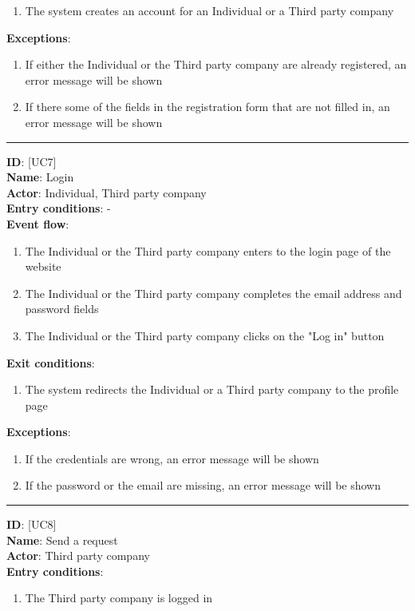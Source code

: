 \documentclass[12pt]{report}
\newcommand\usecase[1]{ [UC#1] }
\begin{document}
\begin{itemize}
\begin{enumerate}
    			\item{The system creates an account for an Individual or a Third party company}
  		\end{enumerate}
  	\textbf{Exceptions}: 
  		\begin{enumerate}
    			\item{If either the Individual or the Third party company are already registered, an error message will be shown}
    			\item{If there some of the fields in the registration form that are not filled in, an error message will be shown}
  		\end{enumerate}
  	\rule{\linewidth}{0.4pt}
  	\textbf{ID}: \usecase{7} \\
  	\textbf{Name}: Login \\
    \textbf{Actor}: Individual, Third party company \\
    \textbf{Entry conditions}: - \\
  	\textbf{Event flow}:
  		\begin{enumerate}
    			\item{The Individual or the Third party company enters to the login page of the website}
    			\item{The Individual or the Third party company completes the email address and password fields}
    			\item{The Individual or the Third party company clicks on the "Log in" button}
  		\end{enumerate}
  	\textbf{Exit conditions}:
  		\begin{enumerate}
    			\item{The system redirects the Individual or a Third party company to the profile page}
  		\end{enumerate}
  	\textbf{Exceptions}: 
  		\begin{enumerate}
    			\item{If the credentials are wrong, an error message will be shown}
    			\item{If the password or the email are missing, an error message will be shown}
  		\end{enumerate}
  	\rule{\linewidth}{0.4pt}
  	\textbf{ID}: \usecase{8} \\
  	\textbf{Name}: Send a request \\
    \textbf{Actor}: Third party company \\
    \textbf{Entry conditions}:
    		\begin{enumerate}
    			\item{The Third party company is logged in}

\end{enumerate}
\end{itemize}
\end{document}
